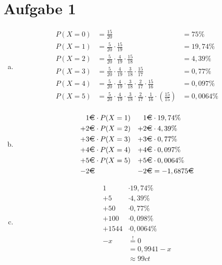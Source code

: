 \documentclass[11pt,a4paper]{article}
\author{Lukas Vormwald \and Noah Mehling \and Gregor Seewald}
\date{Übung 5:Dienstag 12:00}
\newcommand{\Aufgabe}[1]{\section*{Aufgabe #1}}
\begin{document}
  \maketitle

  \Aufgabe{1}

    \begin{enumerate}[a)]

      \item   \begin{align*}
                P(X=0)&=\frac{15}{20}                                                           &=75\%\\
                P(X=1)&=\frac{5}{20} \cdot  \frac{15}{19}                                       &=19,74\%\\
                P(X=2)&=\frac{5}{20} \cdot \frac{4}{19} \cdot \frac{15}{18}                     &=4,39\%\\
                P(X=3)&=\frac{5}{20} \cdot \frac{4}{19} \cdot \frac{3}{18} \cdot \frac{15}{17}  &=0,77\%\\
                P(X=4)&=\frac{5}{20} \cdot \frac{4}{19} \cdot \frac{3}{18} \cdot \frac{2}{17} \cdot \frac{15}{16}  &=0,097\%\\
                P(X=5)&=\frac{5}{20} \cdot \frac{4}{19} \cdot \frac{3}{18} \cdot \frac{2}{17} \cdot \frac{1}{16} \cdot  \left( \frac{15}{15} \right)     &=0,0064\%\\
              \end{align*}

    \item     \begin{align*}
                1 \text{\EUR} & \cdot P(X=1) & 1 \text{\EUR} & \cdot 19,74 \%\\
                + 2 \text{\EUR} & \cdot P(X=2) & + 2 \text{\EUR} & \cdot 4,39 \%\\
                + 3 \text{\EUR} & \cdot P(X=3) & + 3 \text{\EUR} & \cdot 0,77 \%\\
                + 4 \text{\EUR} & \cdot P(X=4) & + 4 \text{\EUR} & \cdot 0,097 \%\\
                + 5 \text{\EUR} & \cdot P(X=5) & + 5 \text{\EUR} & \cdot 0,0064 \%\\
                -2 \text{\EUR}& & - 2 \text{\EUR} & = -1,6875 \text{\EUR}
              \end{align*}

    \item     \begin{align*}
                  1 & \cdot 19,74 \%\\
                  + 5 & \cdot 4,39 \%\\
                  + 50 & \cdot 0,77 \%\\
                  + 100 & \cdot 0,098 \%\\
                  + 1544 & \cdot 0,0064 \%\\
                  - x & \stackrel{!}{=} 0\\
                  &= 0,9941 -x\\
                  &\approx 99 ct
              \end{align*}

    \end{enumerate}
\end{document}

